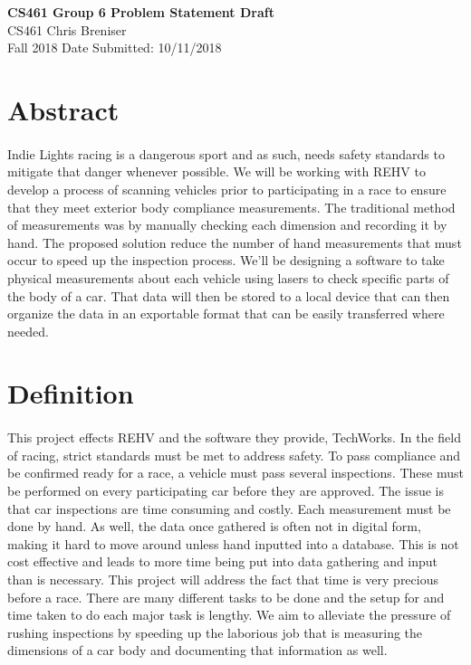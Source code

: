 \documentclass[a4paper, 10pt, onecolumn]{article}
\begin{document}
\noindent
\large\textbf{CS461 Group 6 Problem Statement Draft} \hfill \\
\normalsize CS461 \hfill Chris Breniser \\
Fall 2018 \hfill Date Submitted: 10/11/2018 

\section*{Abstract}

\paragraph{} Indie Lights racing is a dangerous sport and as such, needs safety standards to mitigate that danger whenever possible. We will be working with REHV to develop a process of scanning vehicles prior to participating in a race to ensure that they meet exterior body compliance measurements. The traditional method of measurements was by manually checking each dimension and recording it by hand. The proposed solution reduce the number of hand measurements that must occur to speed up the inspection process. We'll be designing a software to take physical measurements about each vehicle using lasers to check specific parts of the body of a car. That data will then be stored to a local device that can then organize the data in an exportable format that can be easily transferred where needed. 

\section*{Definition}

\paragraph{} This project effects REHV  and the software they provide, TechWorks. 
In the field of racing, strict standards must be met to address safety. To pass compliance and be confirmed ready for a race, a vehicle must pass several inspections. These must be performed on every participating car before they are approved. The issue is that car inspections are time consuming and costly. Each measurement must be done by hand. As well, the data once gathered is often not in digital form, making it hard to move around unless hand inputted into a database. This is not cost effective and leads to more time being put into data gathering and input than is necessary. 
This project will address the fact that time is very precious before a race. There are many different tasks to be done and the setup for and time taken to do each major task is lengthy. We aim to alleviate the pressure of rushing inspections by speeding up the laborious job that is measuring the dimensions of a car body and documenting that information as well. 
\end{document}
